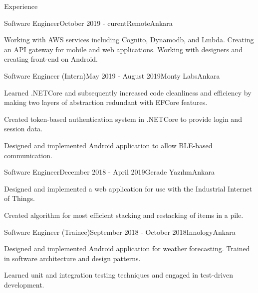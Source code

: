\documentclass{resume} %
\begin{document}
\begin{rSection}{Experience}

    
    
    \begin{rSubsection}{Software Engineer}{October 2019 - curent}{Remote}{Ankara}
        \item Working with AWS services including Cognito, Dynamodb, and Lmbda. Creating an API gateway for mobile and web applications. Working with designers and creating front-end on Android.
    \end{rSubsection}
    
    \begin{rSubsection}{Software Engineer (Intern)}{May 2019 - August 2019}{Monty Labs}{Ankara}
        \item Learned .NETCore and subsequently increased code cleanliness and efficiency by making two layers of abstraction redundant with EFCore features.
        
        \item Created token-based authentication system in .NETCore to provide login and session data.
        
        \item Designed and implemented Android application to allow BLE-based communication.
    \end{rSubsection}
    
    \begin{rSubsection}{Software Engineer}{December 2018 - April 2019}{Gerade Yazılım}{Ankara}
        \item Designed and implemented a web application for use with the Industrial Internet of Things.
        \item Created algorithm for most efficient stacking and restacking of items in a pile.
    \end{rSubsection}
    
    \begin{rSubsection}{Software Engineer (Trainee)}{September 2018 - October 2018}{Innology}{Ankara}
        \item Designed and implemented Android application for weather forecasting. Trained in software architecture and design patterns.
    
        \item Learned unit and integration testing techniques and engaged in test-driven development.
    \end{rSubsection}
    
\end{rSection}
\end{document}

